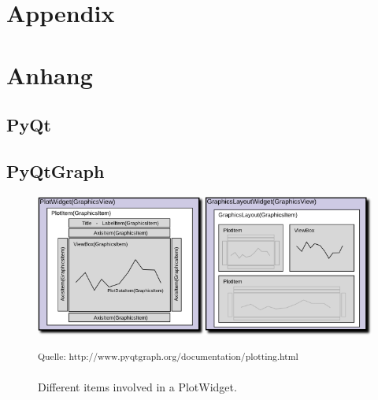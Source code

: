 {\chapter{Appendix}}    %
{\chapter{Anhang}}      %
\label{chap:appendix}

\section{PyQt}
\label{sec:appendix:pyqt}

\setcounter{figure}{0}





\clearpage

\section{PyQtGraph}
\label{sec:appendix:pyqtgraph}

\begin{figure}[h]
    \centering
    \includegraphics[width=14cm]{resources/img/PyQtGraphContent}
    \caption{Different items involved in a PlotWidget.}
    \small\textsuperscript{Quelle: http://www.pyqtgraph.org/documentation/plotting.html}
    \label{a:fig:pyqtgraph:content}
\end{figure}

